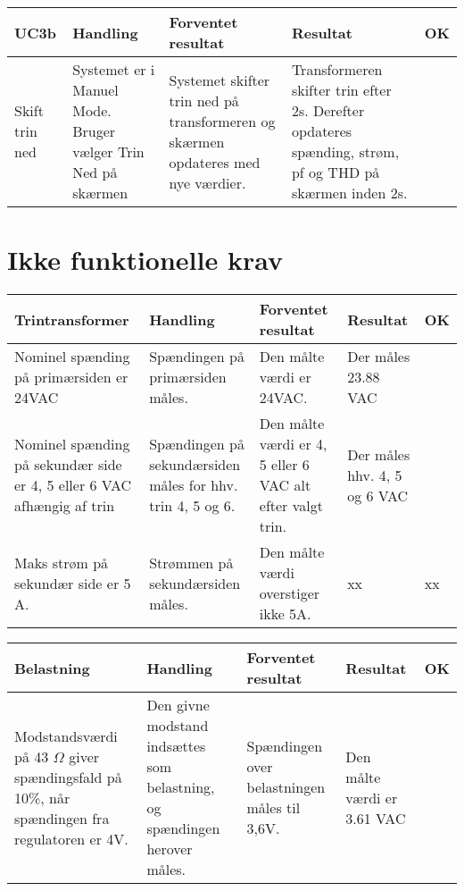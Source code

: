 \begin{table}[H]
	\centering
	\begin{tabular}{|p{2cm}|p{3cm}|p{4cm}|p{4.5cm}|p{1cm}|}
		\hline
		\textbf{UC3b} & \textbf{Handling} & \textbf{Forventet resultat} & \textbf{Resultat} &\textbf{OK} \\\hline
		Skift trin ned & Systemet er i Manuel Mode. Bruger vælger Trin Ned på skærmen & Systemet skifter trin ned på transformeren og skærmen opdateres med nye værdier. & Transformeren skifter trin efter 2s. Derefter opdateres spænding, strøm, pf og THD på skærmen inden 2s.  & \checkmark \\\hline
		
		
	\end{tabular}
	
	
\end{table}

\section{Ikke funktionelle krav}
\begin{table}[H]
	\centering
	\begin{tabular}{|p{4cm}|p{3cm}|p{3cm}|p{3cm}|p{1cm}|}
		\hline
		\textbf{Trintransformer} & \textbf{Handling} & \textbf{Forventet resultat} & \textbf{Resultat} &\textbf{OK} \\\hline
		Nominel spænding på primærsiden er 24VAC & Spændingen på primærsiden måles. & Den målte værdi er 24VAC. & Der måles 23.88 VAC & \checkmark \\\hline
		Nominel spænding på sekundær side er 4, 5 eller 6 VAC afhængig af trin & Spændingen på sekundærsiden måles for hhv. trin 4, 5 og 6. & Den målte værdi er 4, 5 eller 6 VAC alt efter valgt trin. & Der måles hhv. 4, 5 og 6 VAC & \checkmark \\\hline
		Maks strøm på sekundær side er 5 A. & Strømmen på sekundærsiden måles. & Den målte værdi overstiger ikke 5A. & xx  & xx \\\hline
	\end{tabular}
	
\end{table}

\begin{table}[H]
	\centering
	\begin{tabular}{|p{4cm}|p{3cm}|p{3cm}|p{3cm}|p{1cm}|}
		\hline
		\textbf{Belastning} & \textbf{Handling} & \textbf{Forventet resultat} & \textbf{Resultat} &\textbf{OK} \\\hline
		Modstandsværdi på 43 $\Omega$ giver spændingsfald på 10\%, når spændingen fra regulatoren er 4V. & Den givne modstand indsættes som belastning, og spændingen herover måles. & Spændingen over belastningen måles til 3,6V. & Den målte værdi er 3.61 VAC & \checkmark \\\hline	
	\end{tabular}
	
	
\end{table}

